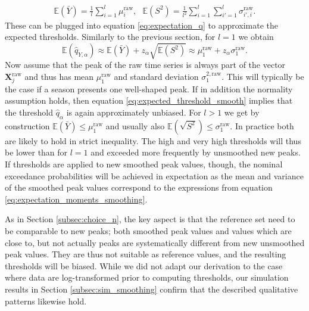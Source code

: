 \documentclass{article}
\begin{document}
\begin{align}
\mathbb{E}(\bar{Y}) = \frac{1}{l} \sum_{i = 1}^l \mu^\text{raw}_i, \ \ \ 
\mathbb{E}(S^2) = \frac{1}{l^2} \sum_{i = 1}^l \sum_{i' = 1}^l \sigma^\text{raw}_{i', i}.
\label{eq:expectation_moments_smoothing}
\end{align}
These can be plugged into equation \eqref{eq:expectation_q} to approximate the expected thresholds. Similarly to the previous section, for $l = 1$ we obtain
\begin{equation}
\mathbb{E}(\hat{q}_{Y, \alpha}) \approx \mathbb{E}(\bar{Y}) + z_\alpha \sqrt{\mathbb{E}(S^2)} \approx \mu^\text{raw}_1 + z_\alpha \sigma^\text{raw}_1.
\label{eq:expected_threshold_smooth}
\end{equation}
Now assume that the peak of the raw time series is always part of the vector $\mathbf{X}_j^\text{raw}$ and thus has mean $\mu^\text{raw}_1$ and standard deviation $\sigma^{2, \text{raw}}_1$. This will typically be the case if a season presents one well-shaped peak. If in addition the normality assumption holds, then equation \eqref{eq:expected_threshold_smooth} implies that the threshold $\hat{q}_\alpha$ is again approximately unbiased. %
For $l > 1$ we get by construction $\mathbb{E}(\bar{Y}) \leq \mu^\text{raw}_1$ and usually also $\mathbb{E}(\sqrt{S^2}) \leq \sigma^\text{raw}_1$. In practice both are likely to hold in strict inequality. The high and very high thresholds will thus be lower than for $l = 1$ and exceeded more frequently by unsmoothed new peaks. If thresholds are applied to new smoothed peak values, though, the nominal exceedance probabilities will be achieved in expectation as the mean and variance of the smoothed peak values correspond to the expressions from equation \eqref{eq:expectation_moments_smoothing}.

As in Section \ref{subsec:choice_n}, the key aspect is that the reference set need to be comparable to new peaks; both smoothed peak values and values which are close to, but not actually peaks are systematically different from new unsmoothed peak values. They are thus not suitable as reference values, and the resulting thresholds will be biased. While we did not adapt our derivation to the case where data are log-transformed prior to computing thresholds, our simulation results in Section \ref{subsec:sim_smoothing} confirm that the described qualitative patterns likewise hold.
\end{document}

